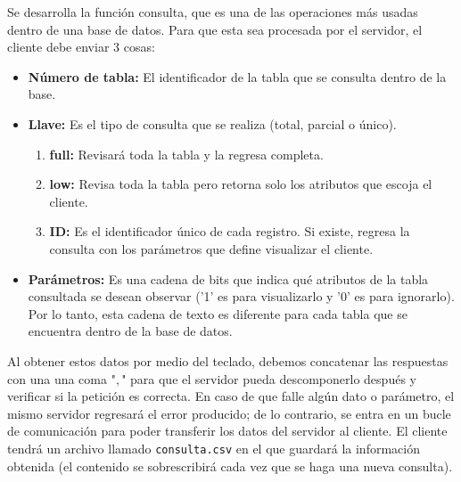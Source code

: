 \documentclass[12pt]{article}
\begin{document}
Se desarrolla la función consulta, que es una de las operaciones más usadas dentro de una base de datos. Para que esta sea procesada por el servidor, el cliente debe enviar 3 cosas:
\begin{itemize}
    \item \textbf{Número de tabla:} El identificador de la tabla que se consulta dentro de la base.
    \item \textbf{Llave:} Es el tipo de consulta que se realiza (total, parcial o único).
    \begin{enumerate}
        \item \textbf{full:} Revisará toda la tabla y la regresa completa.
        \item \textbf{low:} Revisa toda la tabla pero retorna solo los atributos que escoja el cliente.
        \item \textbf{ID:} Es el identificador único de cada registro. Si existe, regresa la consulta con los parámetros que define visualizar el cliente.
    \end{enumerate} 
    \item \textbf{Parámetros:} Es una cadena de bits que indica qué atributos de la tabla consultada se desean observar ('1' es para visualizarlo y '0' es para ignorarlo). Por lo tanto, esta cadena de texto es diferente para cada tabla que se encuentra dentro de la base de datos.
\end{itemize}

Al obtener estos datos por medio del teclado, debemos concatenar las respuestas con una una coma "$,$" para que el servidor pueda descomponerlo después y verificar si la petición es correcta. En caso de que falle algún dato o parámetro, el mismo servidor regresará el error producido; de lo contrario, se entra en un bucle de comunicación para poder transferir los datos del servidor al cliente. El cliente tendrá un archivo llamado \texttt{consulta.csv} en el que guardará la información obtenida (el contenido se sobrescribirá cada vez que se haga una nueva consulta).
\end{document}
